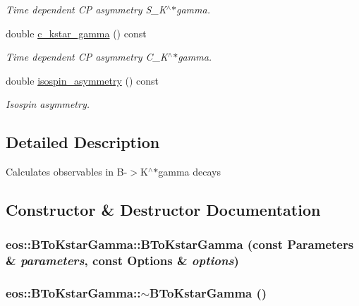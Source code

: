 \begin{DoxyCompactItemize}
\begin{DoxyCompactList}\small\item\em Time dependent CP asymmetry S\_\-K$^\wedge$$\ast$gamma. \item\end{DoxyCompactList}\item 
double \hyperlink{classeos_1_1BToKstarGamma_a8b067c36cdcee5e3e48a261a9bb05895}{c\_\-kstar\_\-gamma} () const 
\begin{DoxyCompactList}\small\item\em Time dependent CP asymmetry C\_\-K$^\wedge$$\ast$gamma. \item\end{DoxyCompactList}\item 
double \hyperlink{classeos_1_1BToKstarGamma_a85935a411404e5dd0b882b03dd000260}{isospin\_\-asymmetry} () const 
\begin{DoxyCompactList}\small\item\em Isospin asymmetry. \item\end{DoxyCompactList}\end{DoxyCompactItemize}


\subsection{Detailed Description}
Calculates observables in B-\/$>$K$^\wedge$$\ast$gamma decays 

\subsection{Constructor \& Destructor Documentation}
\hypertarget{classeos_1_1BToKstarGamma_a8d9742896eb27084656a59b2a9ba4b3f}{
\subsubsection[{BToKstarGamma}]{\setlength{\rightskip}{0pt plus 5cm}eos::BToKstarGamma::BToKstarGamma (const {\bf Parameters} \& {\em parameters}, \/  const {\bf Options} \& {\em options})}}
\label{classeos_1_1BToKstarGamma_a8d9742896eb27084656a59b2a9ba4b3f}
\hypertarget{classeos_1_1BToKstarGamma_a9cb5e53e2bd12d0f3b87f02d0b780207}{
\subsubsection[{$\sim$BToKstarGamma}]{\setlength{\rightskip}{0pt plus 5cm}eos::BToKstarGamma::$\sim$BToKstarGamma ()}}
\label{classeos_1_1BToKstarGamma_a9cb5e53e2bd12d0f3b87f02d0b780207}


